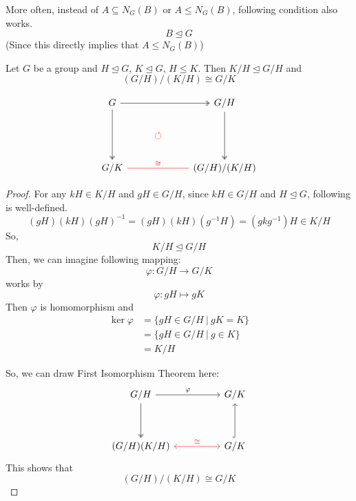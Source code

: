 \documentclass[12pt, a4paper, openany, twoside]{book}
\theoremstyle{definition}
\theoremstyle{remark}
\theoremstyle{plain}
\numberwithin{equation}{section}
\begin{document}
\begin{tcolorbox}[colback=yellow!10!white,colframe=gray!75!black,title=Remark]

More often, instead of $A \subseteq N_G(B)$ or $A \leq N_G(B)$, following condition also works. 
\[B \trianglelefteq G\]
(Since this directly implies that $A \leq N_G(B)$)
\end{tcolorbox}

\begin{tcolorbox}[colback=yellow!10!white,colframe=blue!75!black,title=Third Isomorphism Theorem]

Let $G$ be a group and $H \trianglelefteq G$, $K \trianglelefteq G$, $H \leq K$. Then $K/H \trianglelefteq G/H$ and 
\[(G/H)/(K/H) \cong G/K\]

\[
\begin{tikzcd}
    G \arrow[dd, two heads] \arrow[rr, two heads] & & G/H \arrow[dd, two heads] \\
    & \mathcolor{red}{\circlearrowleft} & \\
    G/K \arrow[rr, no head, red, "\cong"]& & (G/H)/(K/H)
\end{tikzcd}
\]

\end{tcolorbox}

\begin{proof}
    
For any $kH \in K/H$ and $gH \in G/H$, since $kH \in G/H$ and $H \trianglelefteq G$, following is well-defined. 
\[(gH)(kH)(gH)^{-1} = (gH)(kH)(g^{-1}H) = (gkg^{-1})H \in K/H\]
So, 
\[K/H \trianglelefteq G/H\]
Then, we can imagine following mapping: 
\[\varphi: G/H \rightarrow G/K\]
works by 
\[\varphi: gH \mapsto gK\]
Then $\varphi$ is homomorphism and 
\begin{align*}
    \ker \varphi &= \{gH \in G/H ~|~ gK = K\} \\
    &= \{gH \in G/H ~|~ g \in K\} \\
    &= K/H 
\end{align*}

So, we can draw First Isomorphism Theorem here: 
\[
\begin{tikzcd}
    G/H \arrow[rr, "\varphi"] \arrow[dd, two heads] & & G/K \\
        & &     \\
    (G/H)(K/H) \arrow[rr, red, leftrightarrow, "\cong"] & & G/K \arrow[uu, hook]
\end{tikzcd}
\]
This shows that 
\[(G/H)/(K/H) \cong G/K\]
\end{proof}
\end{document}
